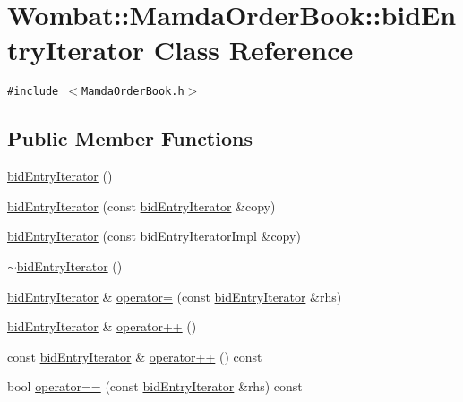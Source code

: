 \hypertarget{classWombat_1_1MamdaOrderBook_1_1bidEntryIterator}{
\section{Wombat::Mamda\-Order\-Book::bid\-Entry\-Iterator Class Reference}
\label{classWombat_1_1MamdaOrderBook_1_1bidEntryIterator}
}
{\tt \#include $<$Mamda\-Order\-Book.h$>$}

\subsection*{Public Member Functions}
\begin{CompactItemize}
\item 
\hyperlink{classWombat_1_1MamdaOrderBook_1_1bidEntryIterator_788b9277e9d0496c76059a792d2a102c}{bid\-Entry\-Iterator} ()
\item 
\hyperlink{classWombat_1_1MamdaOrderBook_1_1bidEntryIterator_1fd6ff11c6da48b8c6104a600e678dce}{bid\-Entry\-Iterator} (const \hyperlink{classWombat_1_1MamdaOrderBook_1_1bidEntryIterator}{bid\-Entry\-Iterator} \&copy)
\item 
\hyperlink{classWombat_1_1MamdaOrderBook_1_1bidEntryIterator_bd79a37f1645aaa516572fb52c2113e8}{bid\-Entry\-Iterator} (const bid\-Entry\-Iterator\-Impl \&copy)
\item 
\hyperlink{classWombat_1_1MamdaOrderBook_1_1bidEntryIterator_c84280290d19d13708beb24d758dbc34}{$\sim$bid\-Entry\-Iterator} ()
\item 
\hyperlink{classWombat_1_1MamdaOrderBook_1_1bidEntryIterator}{bid\-Entry\-Iterator} \& \hyperlink{classWombat_1_1MamdaOrderBook_1_1bidEntryIterator_f51d6828a8018c1496dafe281aed6262}{operator=} (const \hyperlink{classWombat_1_1MamdaOrderBook_1_1bidEntryIterator}{bid\-Entry\-Iterator} \&rhs)
\item 
\hyperlink{classWombat_1_1MamdaOrderBook_1_1bidEntryIterator}{bid\-Entry\-Iterator} \& \hyperlink{classWombat_1_1MamdaOrderBook_1_1bidEntryIterator_bd87703898da018539772ee01339c570}{operator++} ()
\item 
const \hyperlink{classWombat_1_1MamdaOrderBook_1_1bidEntryIterator}{bid\-Entry\-Iterator} \& \hyperlink{classWombat_1_1MamdaOrderBook_1_1bidEntryIterator_3f0899f5af11f1c9e3f9bd8555c583da}{operator++} () const 
\item 
bool \hyperlink{classWombat_1_1MamdaOrderBook_1_1bidEntryIterator_632e553b605c428db7ce2e6817b2318f}{operator==} (const \hyperlink{classWombat_1_1MamdaOrderBook_1_1bidEntryIterator}{bid\-Entry\-Iterator} \&rhs) const 

\end{CompactItemize}
